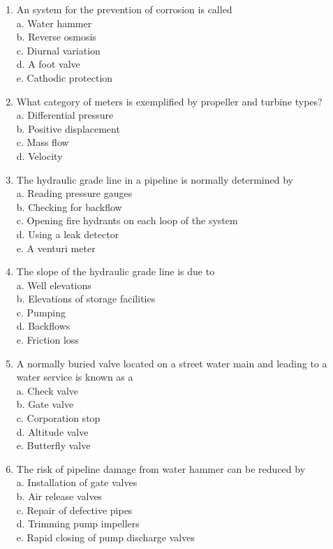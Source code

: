 \begin{enumerate}[1.]
\item An system for the prevention of corrosion is called\\
a. Water hammer\\
b. Reverse osmosis\\
c. Diurnal variation\\
d. A foot valve\\
e. Cathodic protection\\

\item What category of meters is exemplified by propeller and turbine types?\\
a. Differential pressure\\
b.  Positive displacement \\
c. Mass flow\\
d.  Velocity\\

\item The hydraulic grade line in a pipeline is normally determined by\\
a. Reading pressure gauges\\
b. Checking for backflow\\
c. Opening fire hydrants on each loop of the system\\
d. Using a leak detector\\
e. A venturi meter\\

  \item The slope of the hydraulic grade line is due to\\
a. Well elevations\\
b. Elevations of storage facilities\\
c. Pumping\\
d. Backflows\\
e. Friction loss\\

  \item A normally buried valve located on a street water main and leading to a water service is known as a\\
a. Check valve\\
b. Gate valve\\
c. Corporation stop\\
d. Altitude valve\\
e. Butterfly valve\\

  \item The risk of pipeline damage from water hammer can be reduced by\\
a. Installation of gate valves\\
b. Air release valves\\
c. Repair of defective pipes\\
d. Trimming pump impellers\\
e. Rapid closing of pump discharge valves \\


\end{enumerate}
